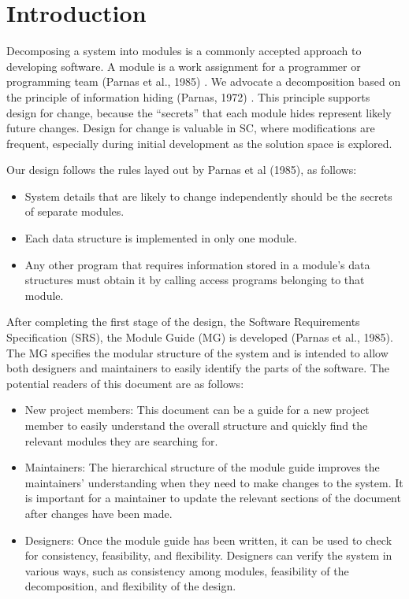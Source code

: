 \documentclass[12pt, titlepage]{article}
\begin{document}
\newpage

\tableofcontents

\listoftables

\listoffigures

\newpage


\section{Introduction}

Decomposing a system into modules is a commonly accepted approach to developing
software.  A module is a work assignment for a programmer or programming
team (Parnas et al., 1985) \cite{ParnasEtAl1985}.  We advocate a decomposition
based on the principle of information hiding (Parnas, 1972) \cite{Parnas1972a}.  This principle supports design for change, because the ``secrets'' that each module hides represent likely future changes.  Design for change is valuable in SC, where modifications are frequent, especially during initial development as the solution space is explored.  

Our design follows the rules layed out by Parnas et al (1985)\cite{ParnasEtAl1985}, as follows:
    \begin{itemize}
    \item System details that are likely to change independently should be the
      secrets of separate modules.
    \item Each data structure is implemented in only one module.
    \item Any other program that requires information stored in a module's data structures must obtain it by calling access programs belonging to that module.
    \end{itemize}

After completing the first stage of the design, the Software Requirements
Specification (SRS), the Module Guide (MG) is developed (Parnas et al., 1985)\cite{ParnasEtAl1985}. The MG specifies the modular structure of the system and is intended to allow both designers and maintainers to easily identify the parts of the software. The potential readers of this document are as follows:

    \begin{itemize}
    \item New project members: This document can be a guide for a new project member to easily understand the overall structure and quickly find the relevant modules they are searching for.
    \item Maintainers: The hierarchical structure of the module guide improves the maintainers' understanding when they need to make changes to the system. It is important for a maintainer to update the relevant sections of the document after changes have been made.
    \item Designers: Once the module guide has been written, it can be used to
      check for consistency, feasibility, and flexibility. Designers can verify the system in various ways, such as consistency among modules, feasibility of the decomposition, and flexibility of the design.
    \end{itemize}
\end{document}
